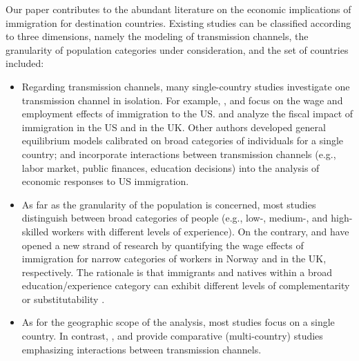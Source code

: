 \documentclass[a4paper,12pt]{article}
\begin{document}
Our paper contributes to the abundant literature on the economic implications of immigration for destination countries. Existing studies can be classified according to three dimensions, namely the modeling of transmission channels, the granularity of population categories under consideration, and the set of countries included:
\begin{itemize}
    \item Regarding transmission channels, many single-country studies investigate one transmission channel in isolation. For example, \citet{Borjas2003}, \citet{Card1990} and \citet{Chassamboulli2014} focus on the wage and employment effects of immigration to the US. \citet{Auerbach1999} and \citet{Dustmann2014} analyze the fiscal impact of immigration in the US and in the UK. Other authors developed general equilibrium models calibrated on broad categories of individuals for a single country; \citet{Storesletten2000} and \citet{Chojnicki2011} incorporate interactions between transmission channels (e.g., labor market, public finances, education decisions) into the analysis of economic responses to US immigration.
    \item As far as the granularity of the population is concerned, most studies distinguish between broad categories of people (e.g., low-, medium-, and high-skilled workers with different levels of experience). On the contrary, \citet{Bratsberg2012} and \citet{Dustmann2013} have opened a new strand of research by quantifying the wage effects of immigration for narrow categories of workers in Norway and in the UK, respectively. The rationale is that immigrants and natives within a broad education/experience category can exhibit different levels of complementarity or substitutability \citep[see also][]{Basso2017,Peri2009}.
    \item As for the geographic scope of the analysis, most studies focus on a single country. In contrast, \citet{Aubry2016}, \citet{Battisti2018} and \citet{Burzynski2018} provide comparative (multi-country) studies emphasizing interactions between transmission channels.
\end{itemize}   
\end{document}
